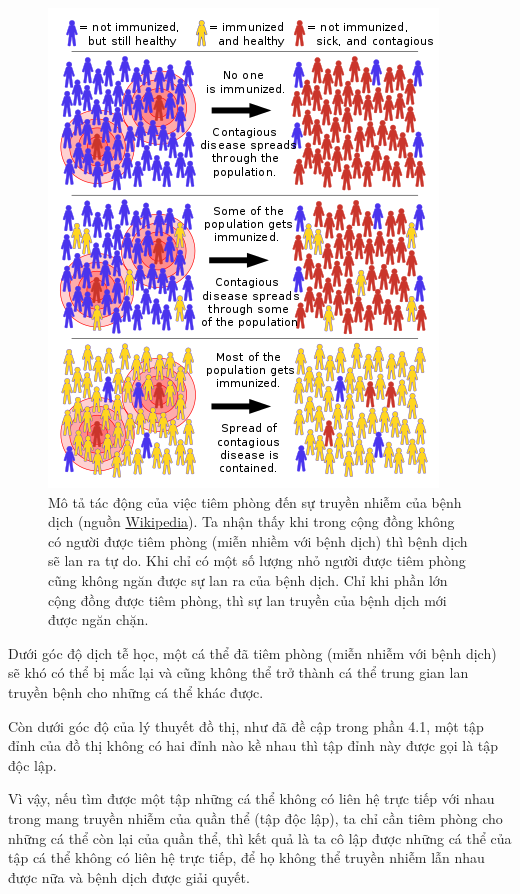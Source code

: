 \documentclass[14pt, oneside, a4paper, openany]{scrartcl}
\begin{document}
\begin{figure}[!h]
	\centering
	\includegraphics[scale=0.7]{figures/Herd_immunity.png} 
	\caption[Mô tả tác động của việc tiêm phòng đến sự truyền nhiễm của bệnh dịch]{Mô tả tác động của việc tiêm phòng đến sự truyền nhiễm của bệnh dịch (nguồn \href{https://en.wikipedia.org/wiki/Herd\_immunity}{Wikipedia}). Ta nhận thấy khi trong cộng đồng không có người được tiêm phòng (miễn nhiềm với bệnh dịch) thì bệnh dịch sẽ lan ra tự do. Khi chỉ có một số lượng nhỏ người được tiêm phòng cũng không ngăn được sự lan ra của bệnh dịch. Chỉ khi phần lớn cộng đồng được tiêm phòng, thì sự lan truyền của bệnh dịch mới được ngăn chặn.}
\end{figure}

Dưới góc độ dịch tễ học, một cá thể đã tiêm phòng (miễn nhiễm với bệnh dịch) sẽ khó có thể bị mắc lại và cũng không thể trở thành cá thể trung gian lan truyền bệnh cho những cá thể khác được. 

Còn dưới góc độ của lý thuyết đồ thị, như đã đề cập trong phần 4.1, một tập đỉnh của đồ thị không có hai đỉnh nào kề nhau thì tập đỉnh này được gọi là tập độc lập. 

Vì vậy, nếu tìm được một tập những cá thể không có liên hệ trực tiếp với nhau trong mang truyền nhiễm của quần thể (tập độc lập), ta chỉ cần tiêm phòng cho những cá thể còn lại của quần thể, thì kết quả là ta cô lập được những cá thể của tập cá thể không có liên hệ trực tiếp, để họ không thể truyền nhiễm lẫn nhau được nữa và bệnh dịch được giải quyết.
\end{document}
